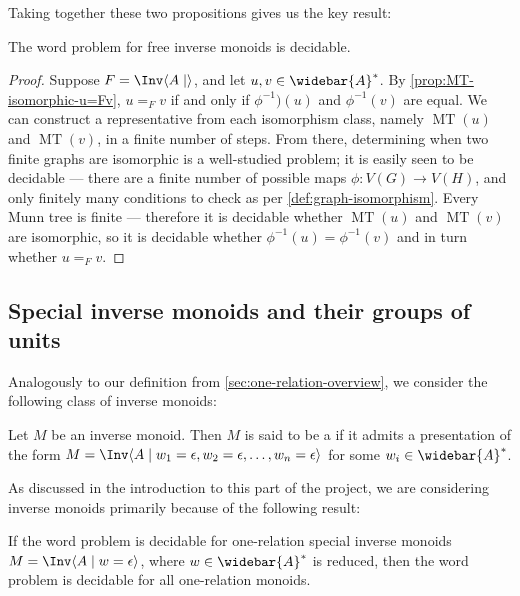 \documentclass[noindex,noinsetproof,emphthm,12pt]{lmaths}
\newcommand{\Abar}{\widebar{A}}
\DeclareMathOperator{\MT}{MT}
\begin{document}
\begin{comment}
\begin{theorem} \label{thm:equal-FIM-iff-Munn-isomorphic}
	Let $u, v \in F = \Inv \langle A\mid\rangle$. Then $u =_F v$ if and only if $\MT(u)$ and $\MT(v)$ are isomorphic as bi-rooted trees, i.e. they are isomorphic as graphs and vertices labelled $\alpha$ and $\beta$ in $\MT(u)$ have their images labelled $\alpha$ and $\beta$ in $\MT(v)$ under $\phi$.
\end{theorem}
\end{comment}

Taking together these two propositions gives us the key result:

\begin{theorem}
	The word problem for free inverse monoids is decidable.
\end{theorem}
\begin{proof}
	Suppose $F = \Inv \langle A \mid\rangle$, and let $u, v \in \Abar^*$. By \cref{prop:MT-isomorphic-u=Fv}, $u =_F v$ if and only if $\phi^{-1})(u)$ and $\phi^{-1}(v)$ are equal. We can construct a representative from each isomorphism class, namely $\MT(u)$ and $\MT(v)$, in a finite number of steps. From there, determining when two finite graphs are isomorphic is a well-studied problem; it is easily seen to be decidable --- there are a finite number of possible maps $\phi : V(G) \to V(H)$, and only finitely many conditions to check as per \cref{def:graph-isomorphism}. Every Munn tree is finite --- therefore it is decidable whether $\MT(u)$ and $\MT(v)$ are isomorphic, so it is decidable whether $\phi^{-1}(u) = \phi^{-1}(v)$ and in turn whether $u =_F v$.
\end{proof}

\subsection{Special inverse monoids and their groups of units}

Analogously to our definition from \cref{sec:one-relation-overview}, we consider the following class of inverse monoids:
\begin{defn}
	Let $M$ be an inverse monoid. Then $M$ is said to be a  if it admits a presentation of the form $M = \Inv \langle A \mid w_1 = \epsilon, w_2 = \epsilon, \ldots, w_n = \epsilon \rangle$ for some $w_i \in \Abar^*$.
\end{defn}

As discussed in the introduction to this part of the project, we are considering inverse monoids primarily because of the following result:
\begin{theorem}
	If the word problem is decidable for one-relation special inverse monoids $M = \Inv \langle A \mid w = \epsilon\rangle$, where $w \in \Abar^*$ is reduced, then the word problem is decidable for all one-relation monoids.
\end{theorem}
\end{document}
